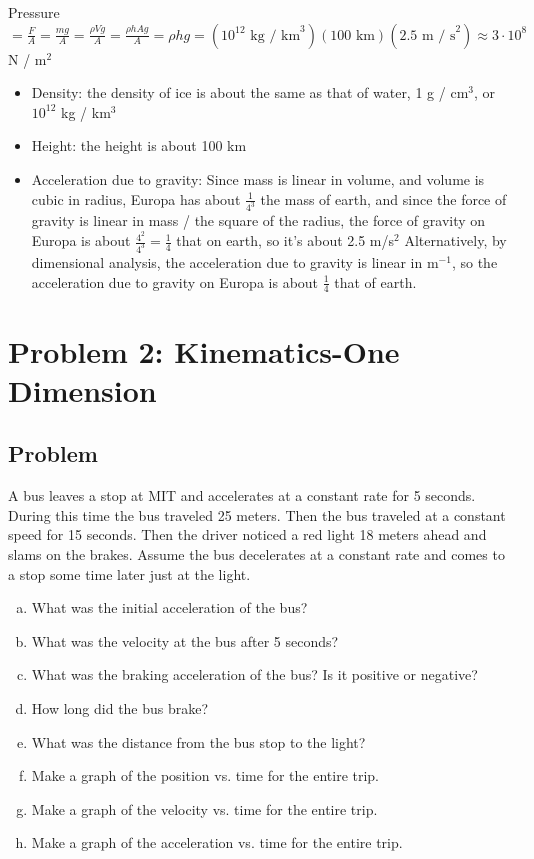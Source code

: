 \documentclass[solutions]{esg8012pset}
\begin{document}
  Pressure $ = \frac{F}{A} = \frac{mg}{A} = \frac{\rho Vg}{A} = \frac{\rho h A g}{A} = \rho h g = (10^{12}\text{ kg / km}^3)(100\text{ km})(2.5\text{ m / s}^2) \approx 3\cdot 10^8$ N / m$^2$
  \begin{itemize}
    \item Density: the density of ice is about the same as that of water, 1 g / cm$^3$, or $10^{12}$ kg / km$^3$
    \item Height: the height is about 100 km
    \item Acceleration due to gravity: Since mass is linear in volume, and volume is cubic in radius, Europa has about $\frac{1}{4^3}$ the mass of earth, and since the force of gravity is linear in mass / the square of the radius, the force of gravity on Europa is about $\frac{4^2}{4^3} = \frac{1}{4}$ that on earth, so it's about 2.5 m/s$^2$  Alternatively, by dimensional analysis, the acceleration due to gravity is linear in m$^{-1}$, so the acceleration due to gravity on Europa is about $\frac{1}{4}$ that of earth.
  \end{itemize}
\section*{Problem 2: Kinematics-One Dimension}
\subsection*{Problem}
  A bus leaves a stop at MIT and accelerates at a constant rate for 5 seconds. During this time the
  bus traveled 25 meters. Then the bus traveled at a constant speed for 15 seconds. Then the driver
  noticed a red light 18 meters ahead and slams on the brakes. Assume the bus decelerates at a
  constant rate and comes to a stop some time later just at the light.
  \begin{enumerate}[a)]
    \item What was the initial acceleration of the bus?
    \item What was the velocity at the bus after 5 seconds?
    \item What was the braking acceleration of the bus? Is it positive or negative?
    \item How long did the bus brake?
    \item What was the distance from the bus stop to the light?
    \item Make a graph of the position vs. time for the entire trip.
    \item Make a graph of the velocity vs. time for the entire trip.
    \item Make a graph of the acceleration vs. time for the entire trip.
  \end{enumerate}
\end{document}
